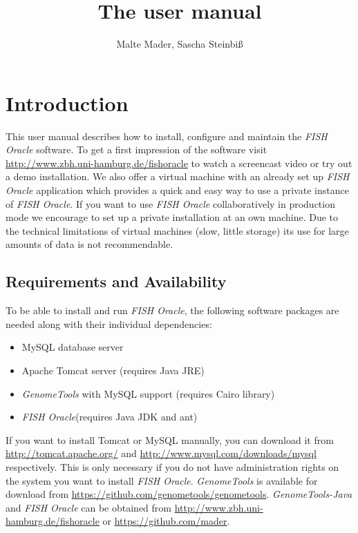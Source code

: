 \documentclass[11pt,final]{article}
\title{The \FO user manual}
\author{Malte Mader, Sascha Steinbi\ss}
\newcommand{\Gt}[0]{\emph{GenomeTools}\xspace}
\newcommand{\Gtj}[0]{\emph{GenomeTools-Java}\xspace}
\newcommand{\FO}[0]{\emph{FISH Oracle}\xspace}
\begin{document}
\maketitle
\tableofcontents

\section{Introduction}

This user manual describes how to install, configure and maintain the
\FO software. To get a first impression of the software visit
\url{http://www.zbh.uni-hamburg.de/fishoracle} to watch a screencast video or
try out a demo installation.
We also offer a virtual machine with an
already set up \FO application which provides a quick and easy way to
use a private instance of \FO. If you want to use \FO
collaboratively in production mode we encourage to set up a private
installation at an own machine. Due to the technical limitations of
virtual machines (slow, little storage) its use for large amounts of
data is not recommendable.

\subsection{Requirements and Availability}

To be able to install and run \FO, the following software packages are
needed along with their individual dependencies:

\begin{itemize}
  \item MySQL database server
  \item Apache Tomcat server (requires Java JRE)
  \item \Gt with MySQL support (requires Cairo library)
  \item \FO (requires Java JDK and ant)
\end{itemize}

If you want to install Tomcat or MySQL manually, you can download it from
\url{http://tomcat.apache.org/} and \url{http://www.mysql.com/downloads/mysql}
respectively. This is only necessary if you do not have administration rights
on the system you want to install \FO.
\Gt is available for download from \url{https://github.com/genometools/genometools}.
\Gtj and \FO can be obtained from \url{http://www.zbh.uni-hamburg.de/fishoracle} or
\url{https://github.com/mader}.
\end{document}
